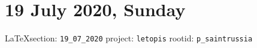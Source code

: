  
 
\section{19 July 2020, Sunday}
  
\vspace{0.5cm}
{\small\LaTeX section: \verb|19_07_2020| project: \verb|letopis| rootid: \verb|p_saintrussia|}
\vspace{0.5cm}

  
